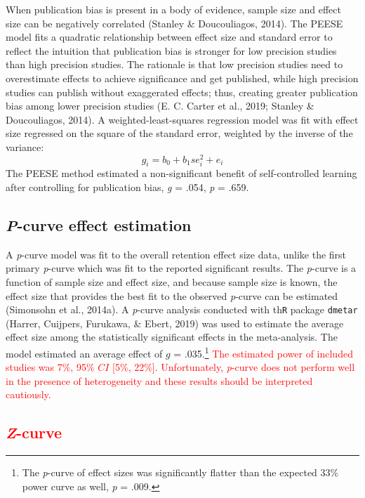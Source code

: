 \documentclass[
  english,
  man,floatsintext]{apa7}
\begin{document}
When publication bias is present in a body of evidence, sample size and effect size can be negatively correlated (Stanley \& Doucouliagos, 2014). The PEESE model fits a quadratic relationship between effect size and standard error to reflect the intuition that publication bias is stronger for low precision studies than high precision studies. The rationale is that low precision studies need to overestimate effects to achieve significance and get published, while high precision studies can publish without exaggerated effects; thus, creating greater publication bias among lower precision studies (E. C. Carter et al., 2019; Stanley \& Doucouliagos, 2014). A weighted-least-squares regression model was fit with effect size regressed on the square of the standard error, weighted by the inverse of the variance:
\[g_{i} = b_{0} + b_{1}se_{i}^2 + e_{i}\]
The PEESE method estimated a non-significant benefit of self-controlled learning after controlling for publication bias, \emph{g} = .054, \emph{p} = .659.

\hypertarget{p-curve-effect-estimation}{%
\subsection{\texorpdfstring{\emph{P}-curve effect estimation}{P-curve effect estimation}}\label{p-curve-effect-estimation}}

A \emph{p}-curve model was fit to the overall retention effect size data, unlike the first primary \emph{p}-curve which was fit to the reported significant results. The \emph{p}-curve is a function of sample size and effect size, and because sample size is known, the effect size that provides the best fit to the observed \emph{p}-curve can be estimated (Simonsohn et al., 2014a). A \emph{p}-curve analysis conducted with th\texttt{R} package \texttt{dmetar} (Harrer, Cuijpers, Furukawa, \& Ebert, 2019) was used to estimate the average effect size among the statistically significant effects in the meta-analysis. The model estimated an average effect of \(g\) = .035.\footnote{The \emph{p}-curve of effect sizes was significantly flatter than the expected 33\% power curve as well, \emph{p} = .009.} \textcolor{red}{The estimated power of included studies was 7\%, 95\% $CI$ [5\%, 22\%]. Unfortunately, \emph{p}-curve does not perform well in the presence of heterogeneity and these results should be interpreted cautiously.}

\hypertarget{section-2}{%
\subsection{\texorpdfstring{\textcolor{red}{\emph{Z}-curve}}{}}\label{section-2}}
\end{document}

